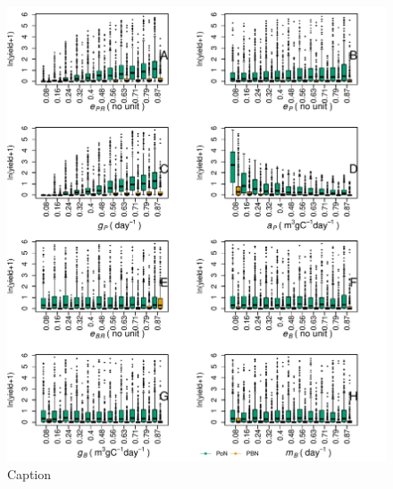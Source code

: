\documentclass[../thesis.tex]{subfiles} %
\begin{document}
\begin{figure}[H]
    \centering
    \includegraphics[width=\linewidth]{result/bacEff.pdf}
    \caption[]{Caption}
    \label{f:bacEffect}
\end{figure}
\end{document}
